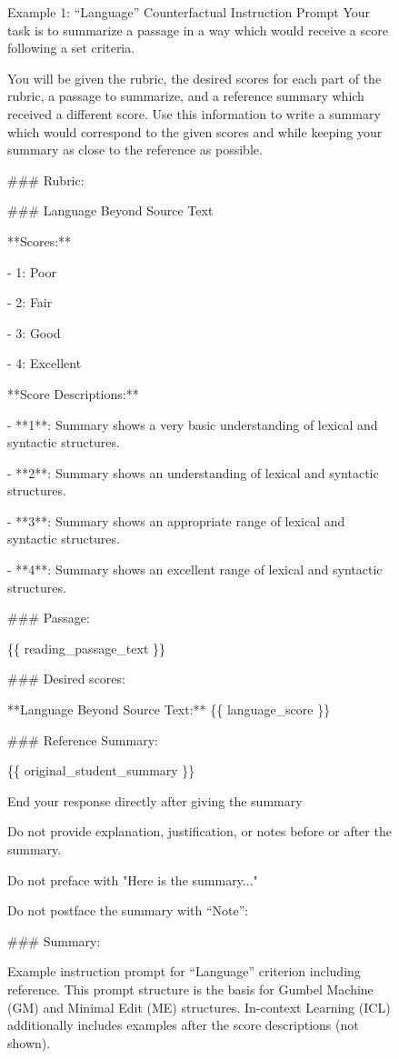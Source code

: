 \begin{figure}
\begin{promptbox}{Example 1: ``Language'' Counterfactual Instruction Prompt}
Your task is to summarize a passage in a way which would receive a score following a set criteria.

You will be given the rubric, the desired scores for each part of the rubric, a passage to summarize, and a reference summary which received a different score.
Use this information to write a summary which would correspond to the given scores and while keeping your summary as close to the reference as possible.

\#\#\# Rubric:

\#\#\# Language Beyond Source Text

**Scores:**

- 1: Poor

- 2: Fair

- 3: Good

- 4: Excellent

**Score Descriptions:**

- **1**: Summary shows a very basic understanding of lexical and syntactic structures.

- **2**: Summary shows an understanding of lexical and syntactic structures.

- **3**: Summary shows an appropriate range of lexical and syntactic structures.

- **4**: Summary shows an excellent range of lexical and syntactic structures.

\#\#\# Passage:

\{\{ reading\_passage\_text \}\}

\#\#\# Desired scores:

**Language Beyond Source Text:** \{\{ language\_score \}\}

\#\#\# Reference Summary:

\{\{ original\_student\_summary \}\}

End your response directly after giving the summary

Do not provide explanation, justification, or notes before or after the summary.

Do not preface with "Here is the summary..."

Do not postface the summary with ``Note'':

\#\#\# Summary:
\end{promptbox}
\caption{Example instruction prompt for ``Language'' criterion including reference. This prompt structure is the basis for Gumbel Machine (GM) and Minimal Edit (ME) structures. In-context Learning (ICL) additionally includes examples after the score descriptions (not shown).}
\label{apx:prompt_ref}
\end{figure}
